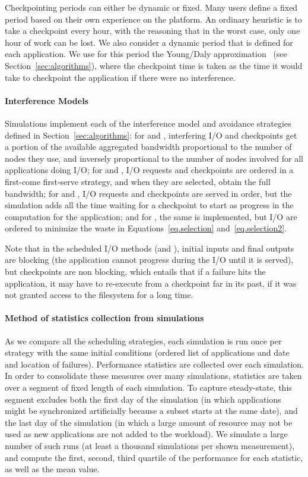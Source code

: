 Checkpointing periods can either be dynamic or fixed. Many users
define a fixed period based on their own experience on the
platform. An ordinary heuristic is to take a checkpoint every hour,
with the reasoning that in the worst case, only one hour of work can
be lost. We also consider a dynamic period that is defined for each
application. We use for this period the Young/Daly
approximation~\cite{young74,daly04} (see Section~\ref{sec:algorithms}), 
where the checkpoint time is
taken as the time it would take to checkpoint the application if there
were no interference.

\paragraph*{Interference Models} Simulations implement each of the
interference model and avoidance strategies defined in
Section~\ref{sec:algorithms}: for \propfixed and \propdaly,
interfering I/O and checkpoints get a portion of the available
aggregated bandwidth proportional to the number of nodes they use, and
inversely proportional to the number of nodes involved for all
applications doing I/O; for \bfifofixed and \bfifodaly, I/O requests
and checkpoints are ordered in a first-come first-serve strategy, and
when they are selected, obtain the full bandwidth; for \fifofixed and
\fifodaly, I/O requests and checkpoints are served in order, but the
simulation adds all the time waiting for a checkpoint to start as
progress in the computation for the application; and for \cooperative,
the same is implemented, but I/O are ordered to minimize the waste in
Equations~\eqref{eq.selection} and~\eqref{eq.selection2}.

Note that in the scheduled I/O methods (\fifononblock and \cooperative),
initial inputs and final outputs are blocking (the application
cannot progress during the I/O until it is served), but checkpoints
are non blocking, which entails that if a failure hits the application,
it may have to re-execute from a checkpoint far in its past, if it was not
granted access to the filesystem for a long time.

\paragraph*{Method of statistics collection from simulations}
As we compare all the scheduling strategies, each simulation is run
once per strategy with the same initial conditions (ordered list of
applications and date and location of failures). Performance
statistics are collected over each simulation. In order to consolidate
these measures over many simulations, statistics are taken over a
segment of fixed length of each simulation.  To capture steady-state,
this segment excludes both
the first day of the simulation (in which applications might be
synchronized artificially because a subset starts at the same date),
and the last day of the simulation (in which a large amount of
resource may not be used as new applications are not added to the
workload). We simulate a large number of such runs (at least a
thousand simulations per shown measurement), and compute the first,
second, third quartile of the performance for each statistic, as well
as the mean value.
